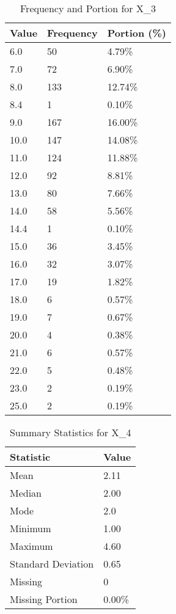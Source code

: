 \begin{table}[H]
\centering
\begin{tabular}{|l|l|l|}
\hline
\textbf{Value} & \textbf{Frequency} & \textbf{Portion (\%)} \\ \hline
6.0 & 50 & 4.79\% \\ \hline
7.0 & 72 & 6.90\% \\ \hline
8.0 & 133 & 12.74\% \\ \hline
8.4 & 1 & 0.10\% \\ \hline
9.0 & 167 & 16.00\% \\ \hline
10.0 & 147 & 14.08\% \\ \hline
11.0 & 124 & 11.88\% \\ \hline
12.0 & 92 & 8.81\% \\ \hline
13.0 & 80 & 7.66\% \\ \hline
14.0 & 58 & 5.56\% \\ \hline
14.4 & 1 & 0.10\% \\ \hline
15.0 & 36 & 3.45\% \\ \hline
16.0 & 32 & 3.07\% \\ \hline
17.0 & 19 & 1.82\% \\ \hline
18.0 & 6 & 0.57\% \\ \hline
19.0 & 7 & 0.67\% \\ \hline
20.0 & 4 & 0.38\% \\ \hline
21.0 & 6 & 0.57\% \\ \hline
22.0 & 5 & 0.48\% \\ \hline
23.0 & 2 & 0.19\% \\ \hline
25.0 & 2 & 0.19\% \\ \hline
\end{tabular}
\caption{Frequency and Portion for X_3}
\end{table}

\begin{table}[H]
\centering
\begin{tabular}{|l|l|}
\hline
\textbf{Statistic} & \textbf{Value} \\ \hline
Mean               & 2.11 \\ \hline
Median             & 2.00 \\ \hline
Mode               & 2.0 \\ \hline
Minimum            & 1.00 \\ \hline
Maximum            & 4.60 \\ \hline
Standard Deviation & 0.65 \\ \hline
Missing            & 0 \\ \hline
Missing Portion    & 0.00\% \\ \hline
\end{tabular}
\caption{Summary Statistics for X_4}
\end{table}

